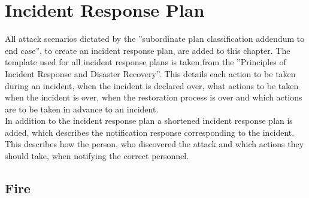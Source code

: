 \section{Incident Response Plan}

All attack scenarios dictated by the ”subordinate plan classification addendum to end case”, to create an incident response plan, are added to this chapter. The template used for all incident response plans is taken from the ”Principles of Incident Response and Disaster Recovery”. This details each action to be taken during an incident, when the incident is declared over, what actions to be taken when the incident is over, when the restoration process is over and which actions are to be taken in advance to an incident.\\In addition to the incident response plan a shortened incident response plan is added, which describes the notification response corresponding to the incident. This describes how the person, who discovered the attack and which actions they should take, when notifying the correct personnel.

\subsection{Fire}

